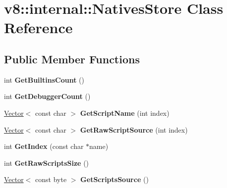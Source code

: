 \hypertarget{classv8_1_1internal_1_1_natives_store}{}\section{v8\+:\+:internal\+:\+:Natives\+Store Class Reference}
\label{classv8_1_1internal_1_1_natives_store}
\subsection*{Public Member Functions}
\begin{DoxyCompactItemize}
\item 
\hypertarget{classv8_1_1internal_1_1_natives_store_aa83dd7318798926fe7e06e933e9d10a3}{}int {\bfseries Get\+Builtins\+Count} ()\label{classv8_1_1internal_1_1_natives_store_aa83dd7318798926fe7e06e933e9d10a3}

\item 
\hypertarget{classv8_1_1internal_1_1_natives_store_ac287c2edbd1fe89ef5754426c159bbfa}{}int {\bfseries Get\+Debugger\+Count} ()\label{classv8_1_1internal_1_1_natives_store_ac287c2edbd1fe89ef5754426c159bbfa}

\item 
\hypertarget{classv8_1_1internal_1_1_natives_store_a1bf5870025d691e06e95e87b0df35277}{}\hyperlink{classv8_1_1internal_1_1_vector}{Vector}$<$ const char $>$ {\bfseries Get\+Script\+Name} (int index)\label{classv8_1_1internal_1_1_natives_store_a1bf5870025d691e06e95e87b0df35277}

\item 
\hypertarget{classv8_1_1internal_1_1_natives_store_aa0c5b6ef2ca177fad6983ff5a61447ac}{}\hyperlink{classv8_1_1internal_1_1_vector}{Vector}$<$ const char $>$ {\bfseries Get\+Raw\+Script\+Source} (int index)\label{classv8_1_1internal_1_1_natives_store_aa0c5b6ef2ca177fad6983ff5a61447ac}

\item 
\hypertarget{classv8_1_1internal_1_1_natives_store_aa34ca5388f46618edbc5ce465a9c023f}{}int {\bfseries Get\+Index} (const char $\ast$name)\label{classv8_1_1internal_1_1_natives_store_aa34ca5388f46618edbc5ce465a9c023f}

\item 
\hypertarget{classv8_1_1internal_1_1_natives_store_a681f248c29e4714cc0ad7b9a05d6db75}{}int {\bfseries Get\+Raw\+Scripts\+Size} ()\label{classv8_1_1internal_1_1_natives_store_a681f248c29e4714cc0ad7b9a05d6db75}

\item 
\hypertarget{classv8_1_1internal_1_1_natives_store_a6e38df0e065424d6ff0952fc4846a2ae}{}\hyperlink{classv8_1_1internal_1_1_vector}{Vector}$<$ const byte $>$ {\bfseries Get\+Scripts\+Source} ()\label{classv8_1_1internal_1_1_natives_store_a6e38df0e065424d6ff0952fc4846a2ae}

\end{DoxyCompactItemize}
